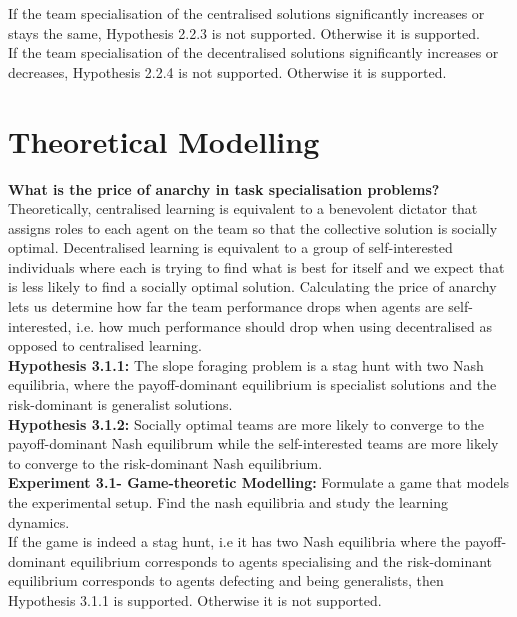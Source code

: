 \documentclass[12pt]{article}
\begin{document}
If the team specialisation of the centralised solutions significantly increases or stays the same, Hypothesis 2.2.3 is not supported.
Otherwise it is supported.\\

If the team specialisation of the decentralised solutions significantly increases or decreases, Hypothesis 2.2.4 is not supported.
Otherwise it is supported.\\

\section{Theoretical Modelling}\label{theoretical_model}

\textbf{What is the price of anarchy in task specialisation problems?}\\

Theoretically, centralised learning is equivalent to a benevolent dictator that assigns roles to each agent on the team so that the collective solution is socially optimal. 
Decentralised learning is equivalent to a group of self-interested individuals where each is trying to find what is best for itself and we expect that is less likely to find a socially optimal solution. 
Calculating the price of anarchy lets us determine how far the team performance drops when agents are self-interested, i.e. how much performance should drop when using decentralised as opposed to centralised learning.\\

\textbf{Hypothesis 3.1.1:} The slope foraging problem is a stag hunt with two Nash equilibria, where the payoff-dominant equilibrium is specialist solutions and the risk-dominant is generalist solutions.\\

\textbf{Hypothesis 3.1.2:} Socially optimal teams are more likely to converge to the payoff-dominant Nash equilibrum while the self-interested teams are more likely to converge to the risk-dominant Nash equilibrium.\\

\textbf{Experiment 3.1- Game-theoretic Modelling:} Formulate a game that models the experimental setup. 
Find the nash equilibria and study the learning dynamics.\\

If the game is indeed a stag hunt, i.e it has two Nash equilibria where the payoff-dominant equilibrium corresponds to agents specialising and the risk-dominant equilibrium corresponds to agents defecting and being generalists, then Hypothesis 3.1.1 is supported.
Otherwise it is not supported.\\
\end{document}
